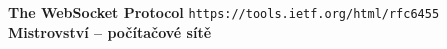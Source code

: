 \documentclass[oneside,12pt,a4paper]{book} %
\begin{document}









\begin{thebibliography}{9}
 {\bf The WebSocket Protocol} \texttt{https://tools.ietf.org/html/rfc6455}
 {\bf Mistrovství – počítačové sítě}
\end{thebibliography}
\end{document}
